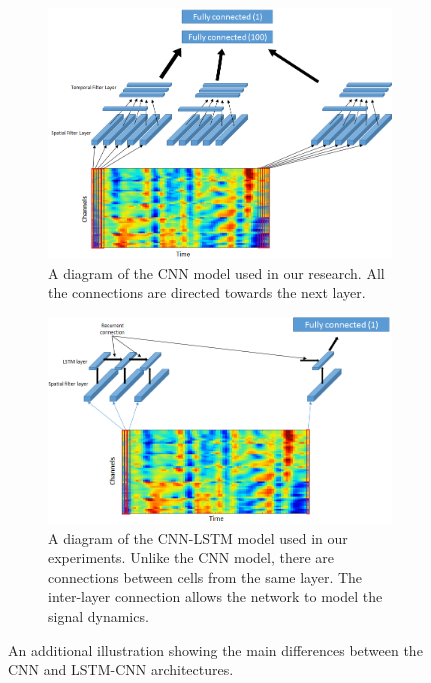 \documentclass[
12pt, %
english, %
doublespacing, %
headsepline, %
]{MastersDoctoralThesis} %
\begin{document}
\begin{figure}
	\centering
	\begin{subfigure}[t]{1.0\textwidth}
			\centering
	\includegraphics[width=1.1\linewidth]{Figures/CNN_detailed}
	\caption{A diagram of the CNN model used in our research. All the connections are directed towards the next layer.}
	\label{fig:CNN_detailed}
	\end{subfigure}
	\begin{subfigure}[t]{1.0\textwidth}
		\centering
		\includegraphics[width=1.1\linewidth]{Figures/LSTM_CNN_detailed}
		\caption{A diagram of the CNN-LSTM model used in our experiments. Unlike the CNN model, there are connections between cells from the same layer. The inter-layer connection allows the network to model the signal dynamics.}
		\label{fig:LSTM_CNN_detailed}
	\end{subfigure}

	\caption{An additional illustration showing the main differences between the CNN and LSTM-CNN architectures.}
\end{figure}
\end{document}

